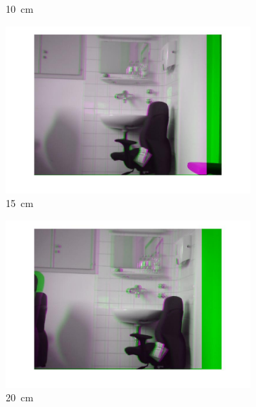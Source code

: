 \begin{figure}[h]
\begin{subfigure}{0.48\linewidth}
    \vspace{-30pt}
    \caption{\SI{10}{\centi\meter}}
  \end{subfigure}
  \vfill
  \begin{subfigure}{0.48\linewidth}
    \centering
    \includegraphics[width=\linewidth]{images/A1_15cm.jpg}
    \vspace{-30pt}
    \caption{\SI{15}{\centi\meter}}
  \end{subfigure}
  \hfill
  \begin{subfigure}{0.48\linewidth}
    \centering
    \includegraphics[width=\linewidth]{images/A1_20cm.jpg}
    \vspace{-30pt}
    \caption{\SI{20}{\centi\meter}}
  \end{subfigure}
  \vfill
  \begin{subfigure}{0.48\linewidth}
    \centering

\end{subfigure}
\end{figure}

